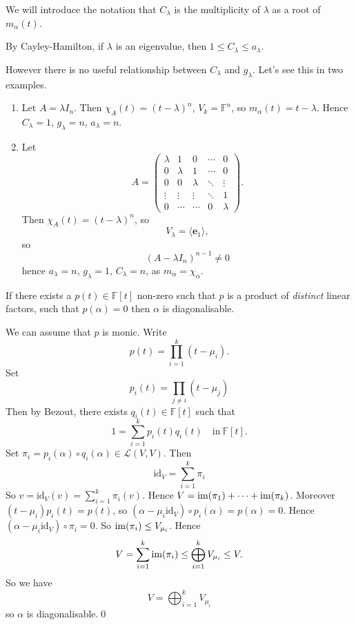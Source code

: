 \documentclass{article}
\newcommand{\F}{\mathbb{F}}
\renewcommand{\id}{\mathrm{id}}
\begin{document}
\par
We will introduce the notation that $ C_\lambda $ is the multiplicity of $ \lambda $ as a root of $ m_\alpha(t) $.
\begin{remark}
  By Cayley-Hamilton, if $ \lambda $ is an eigenvalue, then $ 1\le C_\lambda \le a_\lambda $.
\end{remark}
However there is no useful relationship between $ C_\lambda $ and $ g_\lambda $. Let's see this in two examples.
\begin{enumerate}
	\item Let $ A=\lambda I_n $. Then $ \chi_A(t)=(t-\lambda)^n $, $ V_k=\F^n $, so $ m_\alpha(t)=t-\lambda $. Hence $ C_\lambda=1 $, $ g_\lambda=n $, $ a_\lambda =n$.
	\item Let
		\[
		  A=\begin{pmatrix}
			  \lambda & 1 & 0 & \cdots & 0\\
			  0 & \lambda & 1 & \cdots & 0\\
			  0 & 0 & \lambda & \ddots & \vdots\\
			  \vdots &\vdots & \vdots & \ddots & 1 \\
			  0 & \cdots & \cdots & 0 & \lambda
		  \end{pmatrix}.
		\]
		Then $ \chi_A(t)=(t-\lambda)^n $, so
		\[
		  V_\lambda=\langle \mathbf e_1\rangle,
		\]
		so 
		\[
			(A-\lambda I_n)^{n-1}\ne 0
		\]
		hence $ a_\lambda=n $, $ g_\lambda=1 $, $ C_\lambda =n $, as $ m_\alpha=\chi_\alpha $.
\end{enumerate}
\begin{theorem}
	If there exists a $ p(t)\in \F[t] $ non-zero such that $ p $ is a product of \textit{distinct} linear factors, such that $ p(\alpha)=0 $ then $ \alpha $ is diagonalisable.
\end{theorem}
\pf 
We can assume that $ p $ is monic. Write
\[
	p(t)=\prod_{i=1}^k(t-\mu_i).
\]
Set
\[
p_i(t)=\prod_{j\ne i}(t-\mu_j)
\]
Then by Bezout, there exists $ q_i(t)\in\F[t] $ such that
\[
	1=\sum_{i=1}^kp_i(t)q_i(t)\quad\text{in}\ \F[t].
\]
Set $ \pi_i=p_i(\alpha)\circ q_i(\alpha)\in \mathcal L(V,V) $. Then
\[
	\id_V=\sum_{i=1}^k\pi_i
\]
So $ v=\id_V(v)=\sum_{i=1}^k\pi_i(v) $. Hence $ V=\operatorname{im}(\pi_1)+\cdots+\operatorname{im}(\pi_k) $. Moreover $ (t-\mu_i)p_i(t)=p(t) $, so $ (\alpha-\mu_i\id_V)\circ p_i(\alpha)=p(\alpha)=0 $. Hence $ (\alpha-\mu_i\id_V)\circ\pi_i=0 $. So $ \operatorname{im}(\pi_i)\le V_{\mu_i} $. Hence
\[
	V=\sum_{i=1}^k\operatorname{im}(\pi_i)\le\bigoplus_{i=1}^kV_{\mu_i}\le V.
\]
So we have
\[
	V=\bigoplus_{i=1}^kV_{\mu_i}
\]
so $ \alpha $ is diagonalisable.\qed\par
\end{document}
